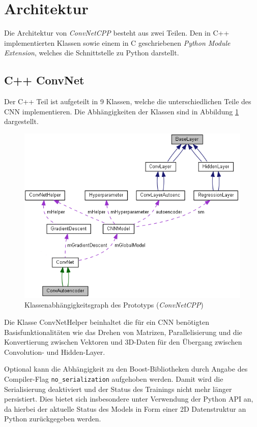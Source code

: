 \section{Architektur}
Die Architektur von \textit{ConvNetCPP} besteht aus zwei Teilen. Den in C++ implementierten Klassen sowie einem in C geschriebenen \textit{Python Module Extension}, welches die Schnittstelle zu Python darstellt.

\subsection{C++ ConvNet}
Der C++ Teil ist aufgeteilt in 9 Klassen, welche die unterschiedlichen Teile des CNN implementieren. Die Abhängigkeiten der Klassen sind in Abbildung \ref{fig:5_class_hierarchie_autoencoder} dargestellt.

\begin{figure}
\centering
\includegraphics[width=0.8\linewidth]{images/5_class_hierarchie_autoencoder}
\caption[]{Klassenabhängigkeitsgraph des Prototyps (\textit{ConvNetCPP})}
\label{fig:5_class_hierarchie_autoencoder}
\end{figure}

Die Klasse ConvNetHelper beinhaltet die für ein CNN benötigten Basisfunktionalitäten wie das Drehen von Matrizen, Parallelisierung und die Konvertierung zwischen Vektoren und 3D-Daten für den Übergang zwischen Convolution- und Hidden-Layer. 

Optional kann die Abhängigkeit zu den Boost-Bibliotheken durch Angabe des Compiler-Flag \texttt{no\_serialization} aufgehoben werden. Damit wird die Serialisierung deaktiviert und der Status des Trainings nicht mehr länger persistiert. Dies bietet sich insbesondere unter Verwendung der Python API an, da hierbei der aktuelle Status des Models in Form einer 2D Datenstruktur an Python zurückgegeben werden.


